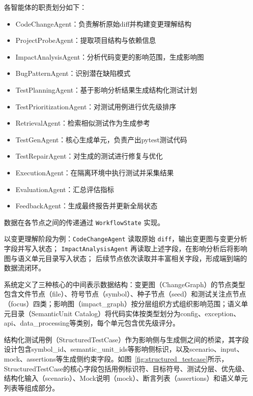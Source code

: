 各智能体的职责划分如下：
\begin{itemize}
    \item CodeChangeAgent：负责解析原始diff并构建变更理解结构
    \item ProjectProbeAgent：提取项目结构与依赖信息
    \item ImpactAnalysisAgent：分析代码变更的影响范围，生成影响图
    \item BugPatternAgent：识别潜在缺陷模式
    \item TestPlanningAgent：基于影响分析结果生成结构化测试计划
    \item TestPrioritizationAgent：对测试用例进行优先级排序
    \item RetrievalAgent：检索相似测试作为生成参考
    \item TestGenAgent：核心生成单元，负责产出pytest测试代码
    \item TestRepairAgent：对生成的测试进行修复与优化
    \item ExecutionAgent：在隔离环境中执行测试并采集结果
    \item EvaluationAgent：汇总评估指标
    \item FeedbackAgent：生成最终报告并更新全局状态
\end{itemize}

数据在各节点之间的传递通过 \texttt{WorkflowState} 实现。

以变更理解阶段为例：\texttt{CodeChangeAgent} 读取原始 \texttt{diff}，输出变更图与变更分析字段并写入状态；
\texttt{ImpactAnalysisAgent} 再读取上述字段，在影响分析后将影响图与语义单元目录写入状态；\allowbreak
后续节点依次读取并丰富相关字段，形成端到端的数据流闭环。

系统定义了三种核心的中间表示数据结构：变更图（ChangeGraph）的节点类型包含文件节点（file）、符号节点（symbol）、种子节点（seed）和测试关注点节点（focus）四类；影响图（impact\_graph）按分层组织方式组织影响范围；语义单元目录（SemanticUnit Catalog）将代码实体按类型划分为config、exception、api、data\_processing等类别，每个单元包含优先级评分。

结构化测试用例（StructuredTestCase）作为影响侧与生成侧之间的桥梁，其字段设计包含symbol\_id、semantic\_unit\_ids等影响侧标识，以及scenario、input、mock、assertions等生成侧约束字段。如图~\ref{fig:structured_testcase}所示，StructuredTestCase的核心字段包括用例标识符、目标符号、测试分层、优先级、结构化输入（scenario）、Mock说明（mock）、断言列表（assertions）和语义单元列表等组成部分。

